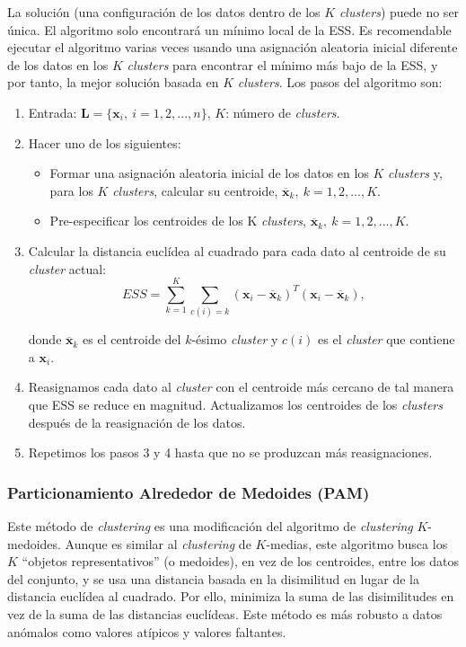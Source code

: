 \documentclass[a4paper, 20pt]{article}
\begin{document}
La solución (una configuración de los datos dentro de los $K$ \textit{clusters}) puede no ser única. El algoritmo solo encontrará un mínimo local de la ESS. Es recomendable ejecutar el algoritmo varias veces usando una asignación aleatoria inicial diferente de los datos en los $K$ \textit{clusters} para encontrar el mínimo más bajo de la ESS, y por tanto, la mejor solución basada en $K$ \textit{clusters}. Los pasos del algoritmo son:
\begin{enumerate}
\item Entrada: $\textbf{L}=\{\textbf{x}_i,\ i=1,2,...,n\}$, $K$: número de \textit{clusters}.

\item Hacer uno de los siguientes:
\begin{itemize}
\item Formar una asignación aleatoria inicial de los datos en los $K$ \textit{clusters} y, para los $K$ \textit{clusters}, calcular su centroide, $\overline{\textbf{x}}_k,\ k=1,2,...,K$.
\item Pre-especificar los centroides de los K \textit{clusters}, $\overline{\textbf{x}}_k,\ k=1,2,...,K$.
\end{itemize}
\item Calcular la distancia euclídea al cuadrado para cada dato al centroide de su \textit{cluster} actual:
$$ESS=\sum_{k=1}^{K}\sum_{c(i)=k}(\textbf{x}_i - \overline{\textbf{x}}_k)^T(\textbf{x}_i - \overline{\textbf{x}}_k),$$

donde $\overline{\textbf{x}}_k$ es el centroide del $k$-ésimo \textit{cluster} y $c(i)$ es el \textit{cluster} que contiene a $\textbf{x}_i$.

\item Reasignamos cada dato al \textit{cluster} con el centroide más cercano de tal manera que ESS se reduce en magnitud. Actualizamos los centroides de los \textit{clusters} después de la reasignación de los datos. 
\item Repetimos los pasos 3 y 4 hasta que no se produzcan más reasignaciones.
\end{enumerate}

\subsubsection{Particionamiento Alrededor de Medoides (PAM)}

Este método de \textit{clustering} es una modificación del algoritmo de \textit{clustering} $K$-medoides. Aunque es similar al \textit{clustering} de $K$-medias, este algoritmo busca los $K$ ``objetos representativos'' (o medoides), en vez de los centroides, entre los datos del conjunto, y se usa una distancia basada en la disimilitud en lugar de la distancia euclídea al cuadrado. Por ello, minimiza la suma de las disimilitudes en vez de la suma de las distancias euclídeas. Este método es más robusto a datos anómalos como valores atípicos y valores faltantes.
\end{document}
